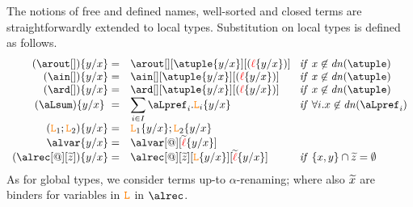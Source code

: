 The notions of free and defined names, well-sorted and closed terms are straightforwardly 
extended to local types. 
%
%
%
Substitution on local types is defined as follows. 
\[
\begin{array}{rl@{\hspace{.3cm}}l}
  (\arout[]) \sust x y  = &  \arout[][\atuple\sust x y][(\alocvar\sust x y)] &  {\it if}\  x\not\in\dn\atuple
  \\
  (\ain[]) \sust x y  = &  \ain[][\atuple\sust x y][(\alocvar\sust x y)] &  {\it if}\  x\not\in\dn\atuple
  \\
  (\ard[]) \sust x y  = &  \ard[][\atuple\sust x y][(\alocvar\sust x y)] &  {\it if}\  x\not\in\dn\atuple
  \\
   (\aLsum)\sust x y  = & \displaystyle{\sum_{i\in I} {{\aLpref_{i}.\aL_{i}}\sust x y}}
   &  {\it if}\  \forall i. x\not\in\dn{\aLpref_i}
  \\
  (\aL_1;\aL_2)\sust x y  = &  \aL_1\sust x y;  \aL_2\sust x y 
  \\
  \alvar\sust x y  = & \alvar[@][\seq\alocvar\sust x y]  
  \\
  (\alrec[@][\seq z])\sust x y  = & \alrec[@][\seq z][\aL\sust x y][\seq\alocvar\sust x y] &  {\it if}\  \{x,y\}\cap\seq z = \emptyset
\end{array}
\]
%
%
%
%
%
As for global types, we consider terms up-to $\alpha$-renaming; where also  $\widetilde{x}$ 
are  binders for variables in $\texttt{\textcolor{orange}L}$ in $\alrec$.
 
